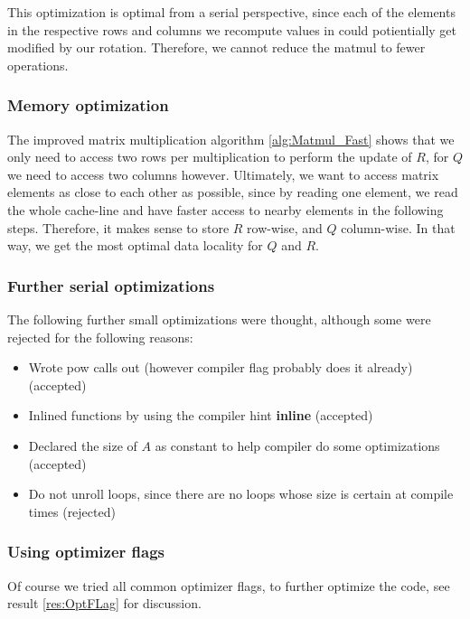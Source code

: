 \documentclass[a4paper]{scrartcl}
\begin{document}
            This optimization is optimal from a serial perspective, since each of
            the elements in the respective rows and columns we recompute values in
            could potientially get modified by our rotation. Therefore, we cannot
            reduce the matmul to fewer operations.
            
        \subsubsection{Memory optimization}
            The improved matrix multiplication algorithm \ref{alg:Matmul_Fast}
            shows that we only need to access two rows per multiplication to
            perform the update of $R$, for $Q$ we need to access two columns
            however. Ultimately, we want to access matrix elements as close to
            each other as possible, since by reading one element, we read the
            whole cache-line and have faster access to nearby elements in the
            following steps. Therefore, it makes sense to store $R$ row-wise,
            and $Q$ column-wise. In that way, we get the most optimal data
            locality for $Q$ and $R$.
        
        \subsubsection{Further serial optimizations}
            The following further small optimizations were thought, although
            some were rejected for the following reasons:

            \begin{itemize}
                \item Wrote pow calls out (however compiler flag probably does it already) (accepted)
                \item Inlined functions by using the compiler hint \textbf{inline} (accepted)
                \item Declared the size of $A$ as constant to help compiler do some optimizations (accepted)
                \item Do not unroll loops, since there are no loops whose size is certain at compile times (rejected)
            \end{itemize}
        
        \subsubsection{Using optimizer flags}
            Of course we tried all common optimizer flags, to further optimize
            the code, see result \ref{res:OptFLag} for discussion.
\end{document}
